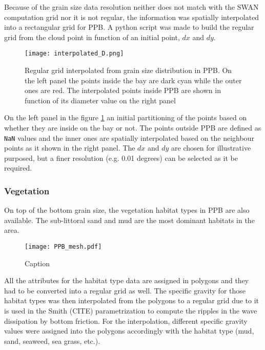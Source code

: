 \documentclass[12pt]{article}
\begin{document}
Because of the grain size data resolution neither does not match with the SWAN computation grid nor it is not regular, the information was spatially interpolated into a rectangular grid for PPB. A python script was made to build the regular grid from the cloud point in function of an initial point, $dx$ and $dy$.

\begin{figure}[h]
    \centering
    \texttt{[image: interpolated\_D.png]}
    \caption{Regular grid interpolated from grain size distribution in PPB. On the left panel the points inside the bay are dark cyan while the outer ones are red. The interpolated points inside PPB are shown in function of its diameter value on the right panel}
    \label{fig:interpolated_D}
\end{figure}

On the left panel in the figure \ref{fig:interpolated_D} an initial partitioning of the points based on whether they are inside on the bay or not. The points outside PPB are defined as \verb|NaN| values and the inner ones are spatially interpolated based on the neighbour points as it shown in the right panel. The $dx$ and $dy$ are chosen for illustrative purposed, but a finer resolution (e.g. 0.01 degrees) can be selected as it be required.

\subsubsection*{Vegetation}

On top of the bottom grain size, the vegetation habitat types in PPB are also available. The sub-littoral sand and mud are the most dominant habitats in the area.

\begin{figure}
    \centering
    \texttt{[image: PPB\_mesh.pdf]}
    \caption{Caption}
    \label{fig:enter-label}
\end{figure}

All the attributes for the habitat type data are assigned in polygons and they had to be converted into a regular grid as well. The specific gravity for those habitat types was then interpolated from the polygons to a regular grid due to it is used in the Smith (CITE) parametrization to compute the ripples in the wave dissipation by bottom friction. For the interpolation, different specific gravity values were assigned into the polygons accordingly with the habitat type (mud, sand, seaweed, sea grass, etc.). 
\end{document}
